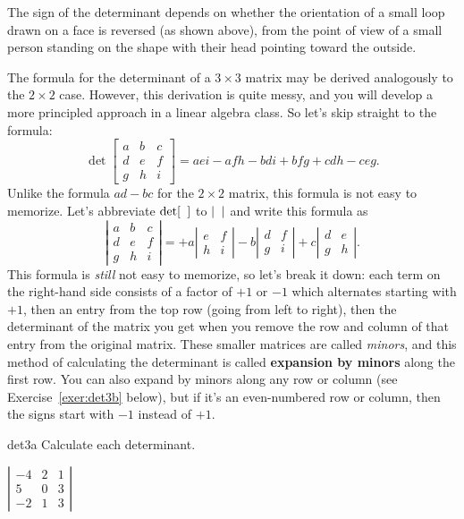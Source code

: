 \documentclass[svgnames]{watsonbook}
\begin{document}
The sign of the determinant depends on whether the orientation of a
small loop drawn on a face is reversed (as shown above), from the
point of view of a small person standing on the shape with their head
pointing toward the outside.

The formula for the determinant of a $3 \times 3$ matrix may be
derived analogously to the $2\times 2$ case. However, this derivation
is quite messy, and you will develop a more principled approach in a
linear algebra class. So let's skip straight to the formula:
\[
\det \left[\begin{array}{ccc} a & b & c \\ d & e & f \\ g & h & i \end{array}\right] = 
aei - afh - bdi + bfg + cdh - ceg. 
\]
Unlike the formula $ad - bc$ for the $2\times 2$ matrix, this formula is not easy to memorize. Let's abbreviate $\det [ \hphantom{a} ]$ to $| \hphantom{a}|$ and write this formula as 
\[
\left|\begin{array}{ccc} a & b & c \\ d & e & f \\ g & h & i \end{array}\right| = 
+a \left|\begin{array}{cc} e & f \\  h & i \end{array}\right| 
-b \left|\begin{array}{cc} d & f \\  g & i \end{array}\right| 
+c \left|\begin{array}{cc} d & e \\  g & h \end{array}\right|. 
\]
This formula is \textit{still} not easy to memorize, so let's break it down: each term on the right-hand side consists of a factor of $+1$ or $-1$ which alternates starting with $+1$, then an entry from the top row (going from left to right), then the determinant of the matrix you get when you remove the row and column of that entry from the original matrix. These smaller matrices are called \textit{minors}, and this method of calculating the determinant is called \textbf{expansion by minors} along the first row. You can also expand by minors along any row or column (see Exercise~\ref{exer:det3b} below), but if it's an even-numbered row or column, then the signs start with $-1$ instead of $+1$. 

\begin{exercise}{}{det3a} \setcounter{subitm}{1}
  Calculate each determinant. 

{$\left|\begin{array}{ccc} -4 & 2 & 1 \\ 5 & 0 & 3 \\ -2 & 1 & 3 \end{array}\right|$}
\end{exercise}
\end{document}
